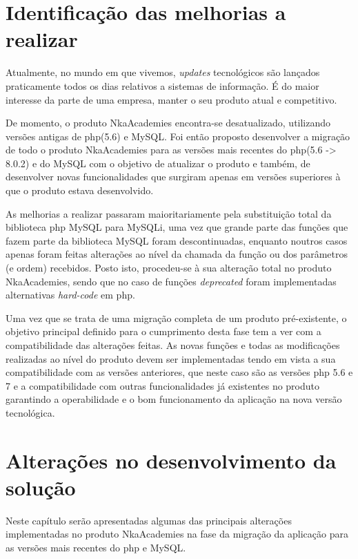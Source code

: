 \section{Identificação das melhorias a realizar}

Atualmente, no mundo em que vivemos, \textit{updates} tecnológicos são lançados praticamente todos os dias relativos a sistemas de informação. É do maior interesse da parte de uma empresa, manter o seu produto atual e competitivo.

De momento, o produto NkaAcademies encontra-se desatualizado, utilizando versões antigas de \acrshort{php}(5.6) e MySQL. Foi então proposto desenvolver a migração de todo o produto NkaAcademies para as versões mais recentes do \acrshort{php}(5.6 -> 8.0.2) e do MySQL com o objetivo de atualizar o produto e também, de desenvolver novas funcionalidades que surgiram apenas em versões superiores à que o produto estava desenvolvido.

As melhorias a realizar passaram maioritariamente pela substituição total da biblioteca \acrshort{php} MySQL para MySQLi, uma vez que grande parte das funções que fazem parte da biblioteca MySQL foram descontinuadas, enquanto noutros casos apenas foram feitas alterações ao nível da chamada da função ou dos parâmetros (e ordem) recebidos. Posto isto, procedeu-se à sua alteração total no produto NkaAcademies, sendo que no caso de funções \textit{deprecated} foram implementadas alternativas \textit{hard-code} em \acrshort{php}.

Uma vez que se trata de uma migração completa de um produto pré-existente, o objetivo principal definido para o cumprimento desta fase tem a ver com a compatibilidade das alterações feitas. As novas funções e todas as modificações realizadas ao nível do produto devem ser implementadas tendo em vista a sua compatibilidade com as versões anteriores, que neste caso são as versões \acrshort{php} 5.6 e 7 e a compatibilidade com outras funcionalidades já existentes no produto garantindo a operabilidade e o bom funcionamento da aplicação na nova versão tecnológica.

\section{Alterações no desenvolvimento da solução}

Neste capítulo serão apresentadas algumas das principais alterações implementadas no produto NkaAcademies na fase da migração da aplicação para as versões mais recentes do \acrshort{php} e MySQL.

